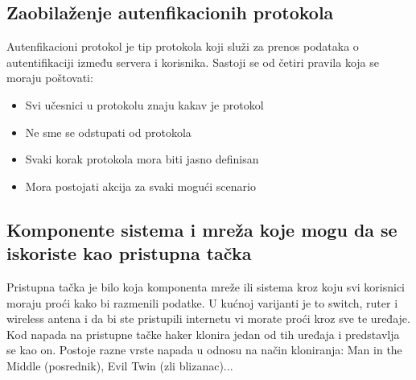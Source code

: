 \documentclass[a4paper]{article}
\begin{document}
{\subsection{Zaobilaženje autenfikacionih protokola}
Autenfikacioni protokol je tip protokola koji služi za prenos podataka o autentifikaciji između servera i korisnika. Sastoji se od četiri pravila koja se moraju poštovati: 
\begin{itemize}
\item Svi učesnici u protokolu znaju kakav je protokol
\item Ne sme se odstupati od protokola
\item Svaki korak protokola mora biti jasno definisan
\item Mora postojati akcija za svaki mogući scenario \cite{authprotocolscrypto} \cite{authprotocolswiki}
\end{itemize}


\subsection{Komponente sistema i mreža koje mogu da se iskoriste kao pristupna tačka}
Pristupna tačka je bilo koja komponenta mreže ili sistema kroz koju svi korisnici moraju proći kako bi razmenili podatke. U kućnoj varijanti je to switch, ruter i wireless antena i da bi ste pristupili internetu vi morate proći kroz sve te uređaje. Kod napada na pristupne tačke haker klonira jedan od tih uređaja i predstavlja se kao on. Postoje razne vrste napada u odnosu na način kloniranja: Man in the Middle (posrednik), Evil Twin (zli blizanac)...
\newpage

}
\end{document}
